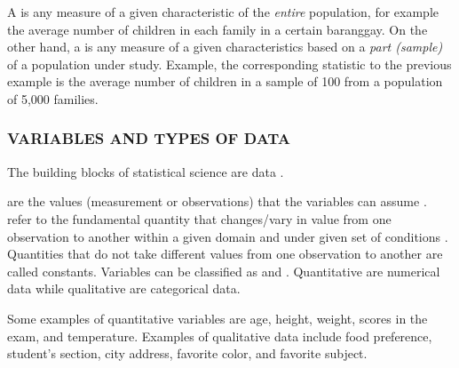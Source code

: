 A  is any measure of a given characteristic of the \textit{entire} population, for
example the average number of children in each family in a certain baranggay. On the other
hand, a  is any measure of a given characteristics based on a \textit{part (sample)} of a
population under study. Example, the corresponding statistic to the previous example is the
average number of children in a sample of 100 from a population of 5,000 families.

\subsubsection*{VARIABLES AND TYPES OF DATA}
The building blocks of statistical science are data \parencite{psasrtc}.
\begin{definition}[Data]
 are the values (measurement or observations) that the variables can assume \parencite{bulman}.  refer to the fundamental quantity that changes/vary in value from one observation to another within a given domain and under given set of conditions \parencite{delrosario}. Quantities that do not take different values from one observation to another are called constants. Variables can be classified as  and . Quantitative are numerical data while qualitative are categorical data. %
\end{definition}
Some examples of quantitative variables are age, height, weight, scores in the exam,
and temperature. Examples of qualitative data include food preference, student's section, city
address, favorite color, and favorite subject.
